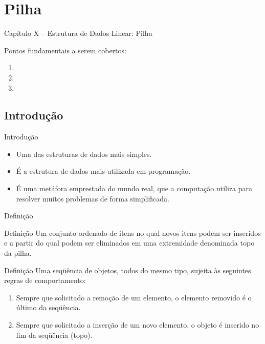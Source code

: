 

\section{Pilha}

\begin{frame}
\begin{center}
{\Large Capítulo X -- Estrutura de Dados Linear: Pilha}

Pontos fundamentais a serem cobertos:

\begin{enumerate}
  \item 
  \item 
  \item 
\end{enumerate}

\end{center}

\end{frame}



\subsection{Introdução} 

  \begin{frame}{Introdução}    
		\begin{itemize}
			\item Uma das estruturas de dados mais simples.
			\item É a estrutura de dados mais utilizada em programação.
			\item É uma metáfora emprestada do mundo real, que a computação utiliza para resolver muitos problemas de forma simplificada.
		\end{itemize}
  \end{frame}
  
   \begin{frame}{Definição}
     \begin{block}{Definição}
       Um conjunto ordenado de itens no qual novos itens podem ser inseridos e a partir do qual podem ser eliminados em uma extremidade denominada \alert{topo} da pilha.
     \end{block}
     \pause
     \begin{block}{Definição}
       Uma seqüência de objetos, todos do mesmo tipo, sujeita às seguintes regras de comportamento:       
				\begin{enumerate}
					\item Sempre que solicitado a remoção de um elemento, o elemento removido é o último da seqüência.
					\item Sempre que solicitado a inserção de um novo elemento, o objeto é inserido no fim da seqüência (\alert{topo}).
				\end{enumerate}
     \end{block}  
   \end{frame}
  
